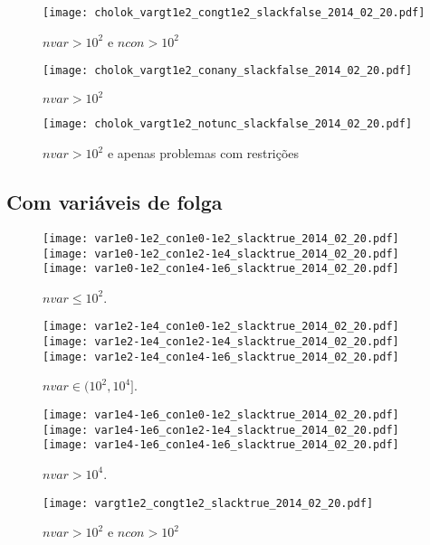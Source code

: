 \documentclass{article}
\begin{document}
\begin{figure}[H]
\centering
\texttt{[image: cholok\_vargt1e2\_congt1e2\_slackfalse\_2014\_02\_20.pdf]}
\caption{ $nvar > 10^2$ e $ncon > 10^2$ }
\label{fig:both_medium_and_big}
\end{figure}

\begin{figure}[H]
\centering
\texttt{[image: cholok\_vargt1e2\_conany\_slackfalse\_2014\_02\_20.pdf]}
\caption{ $nvar > 10^2$ }
\label{fig:nvar_medium_and_big}
\end{figure}

\begin{figure}[H]
\centering
\texttt{[image: cholok\_vargt1e2\_notunc\_slackfalse\_2014\_02\_20.pdf]}
\caption{ $nvar > 10^2$ e apenas problemas com restrições }
\label{fig:nvar_medium_and_big_not_unc}
\end{figure}

\newpage
\subsection{Com variáveis de folga}

\begin{figure}[H]
\centering
\texttt{[image: var1e0-1e2\_con1e0-1e2\_slacktrue\_2014\_02\_20.pdf]}
\texttt{[image: var1e0-1e2\_con1e2-1e4\_slacktrue\_2014\_02\_20.pdf]}
\texttt{[image: var1e0-1e2\_con1e4-1e6\_slacktrue\_2014\_02\_20.pdf]}
\caption{ $nvar \leq 10^2$. }
\label{fig:nvar_small}
\end{figure}
\begin{figure}[H]
\centering
\texttt{[image: var1e2-1e4\_con1e0-1e2\_slacktrue\_2014\_02\_20.pdf]}
\texttt{[image: var1e2-1e4\_con1e2-1e4\_slacktrue\_2014\_02\_20.pdf]}
\texttt{[image: var1e2-1e4\_con1e4-1e6\_slacktrue\_2014\_02\_20.pdf]}
\caption{ $nvar \in (10^2,10^4]$. }
\label{fig:nvar_medium}
\end{figure}
\begin{figure}[H]
\centering
\texttt{[image: var1e4-1e6\_con1e0-1e2\_slacktrue\_2014\_02\_20.pdf]}
\texttt{[image: var1e4-1e6\_con1e2-1e4\_slacktrue\_2014\_02\_20.pdf]}
\texttt{[image: var1e4-1e6\_con1e4-1e6\_slacktrue\_2014\_02\_20.pdf]}
\caption{ $nvar > 10^4$. }
\label{fig:nvar_big}
\end{figure}

\begin{figure}[H]
\centering
\texttt{[image: vargt1e2\_congt1e2\_slacktrue\_2014\_02\_20.pdf]}
\caption{ $nvar > 10^2$ e $ncon > 10^2$ }
\label{fig:both_medium_and_big}
\end{figure}
\end{document}
